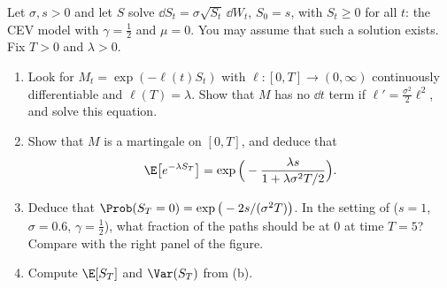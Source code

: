 \begin{exercise}\label{ex:sde-feller}
\medium Let $\sigma,s>0$ and let $S$ solve $\dd S_t=\sigma\sqrt{S_t}\,\dd W_t$, $S_0=s$, with
$S_t\ge0$ for all $t$: the CEV model with $\gamma=\frac12$ and $\mu=0$. You may assume that
such a solution exists. Fix $T>0$ and $\lambda>0$.
\begin{enumerate}[label=(\alph*)]
  \item Look for $M_t=\exp(-\ell(t)S_t)$ with $\ell:[0,T]\to(0,\infty)$ continuously
    differentiable and $\ell(T)=\lambda$. Show that $M$ has no $\dd t$ term if
    $\ell'=\frac{\sigma^2}{2}\ell^2$, and solve this equation.
  \item Show that $M$ is a martingale on $[0,T]$, and deduce that
    \[
      \E\big[e^{-\lambda S_T}\big]=\exp\Big(-\frac{\lambda s}{1+\lambda\sigma^2T/2}\Big).
    \]
  \item Deduce that $\Prob(S_T=0)=\exp\big(-2s/(\sigma^2T)\big)$. In the setting of
     ($s=1$, $\sigma=0.6$, $\gamma=\frac12$), what fraction of the paths
    should be at $0$ at time $T=5$? Compare with the right panel of the figure.
  \item Compute $\E[S_T]$ and $\Var(S_T)$ from (b).
\end{enumerate}
\end{exercise}

